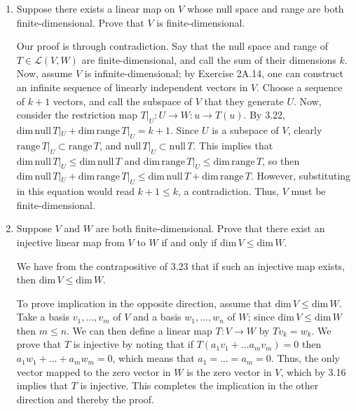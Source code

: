 \documentclass{book}
\begin{document}
\begin{enumerate}
\item Suppose there exists a linear map on \(V\) whose null space and range are both finite-dimensional.  Prove that \(V\) is finite-dimensional.

Our proof is through contradiction.  Say that the null space and range of \(T \in \mathcal{L}(V,W)\) are finite-dimensional, and call the sum of their dimensions \(k\).  Now, assume \(V\) is infinite-dimensional; by Exercise 2A.14, one can construct an infinite sequence of linearly independent vectors in \(V\).  Choose a sequence of \(k+1\) vectors, and call the subspace of \(V\) that they generate \(U\).  Now, consider the restriction map \(T|_U:U \rightarrow W:u \rightarrow T(u)\).  By 3.22, \(\textrm{dim} \, \textrm{null} \, T|_U + \textrm{dim} \, \textrm{range} \, T|_U = k+1\).  Since \(U\) is a subspace of \(V\), clearly \(\textrm{range} \, T|_U \subset \textrm{range} \, T\), and \(\textrm{null} \, T|_U \subset \textrm{null} \, T\).  This implies that \(\textrm{dim} \, \textrm{null} \, T|_U \leq \textrm{dim} \, \textrm{null} \, T\) and \(\textrm{dim} \, \textrm{range} \, T|_U \leq \textrm{dim} \, \textrm{range} \, T\), so then \(\textrm{dim} \, \textrm{null} \, T|_U + \textrm{dim} \, \textrm{range} \, T|_U \leq \textrm{dim} \, \textrm{null} \, T + \textrm{dim} \, \textrm{range} \, T\).  However, substituting in this equation would read \(k+1 \leq k\), a contradiction.  Thus, \(V\) must be finite-dimensional.

\item Suppose \(V\) and \(W\) are both finite-dimensional.  Prove that there exist an injective linear map from \(V\) to \(W\) if and only if \(\textrm{dim} \, V \leq \textrm{dim} \, W\).

We have from the contrapositive of 3.23 that if such an injective map exists, then \(\textrm{dim} \, V \leq \textrm{dim} \, W\).

To prove implication in the opposite direction, assume that \(\textrm{dim} \, V \leq \textrm{dim} \, W\).  Take a basis \(v_1,\dots,v_m\) of \(V\) and a basis \(w_1,\dots,w_n\) of \(W\); since \(\textrm{dim} \, V \leq \textrm{dim} \, W\) then \(m \leq n\).  We can then define a linear map \(T: V \rightarrow W\) by \(Tv_k=w_k\).  We prove that \(T\) is injective by noting that if \(T(a_1v_1+\dots a_mv_m)=0\) then \(a_1w_1+\dots+a_mw_m=0\), which means that \(a_1=\dots=a_m=0\).  Thus, the only vector mapped to the zero vector in \(W\) is the zero vector in \(V\), which by 3.16 implies that \(T\) is injective.  This completes the implication in the other direction and thereby the proof.


\end{enumerate}
\end{document}
